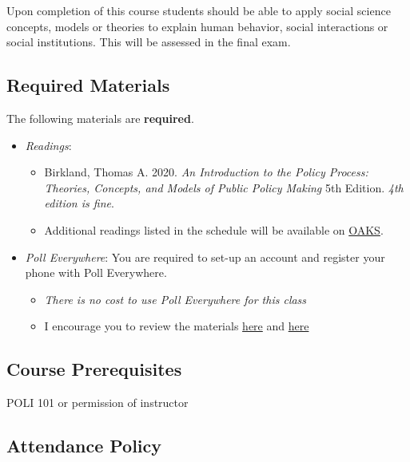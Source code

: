 Upon completion of this course students should be able to apply social
science concepts, models or theories to explain human behavior, social
interactions or social institutions. This will be assessed in the final
exam.

\hypertarget{required-materials}{%
\subsection{Required Materials}\label{required-materials}}

The following materials are \textbf{required}.

\begin{itemize}

\item
  \emph{Readings}:

  \begin{itemize}
  
  \item
    Birkland, Thomas A. 2020. \emph{An Introduction to the Policy
    Process: Theories, Concepts, and Models of Public Policy Making} 5th
    Edition. \emph{4th edition is fine}.
  \item
    Additional readings listed in the schedule will be available on
    \href{https://lms.cofc.edu/d2l/login}{OAKS}.
  \end{itemize}
\item
  \emph{Poll Everywhere}: You are required to set-up an account and
  register your phone with Poll Everywhere.

  \begin{itemize}
  
  \item
    \emph{There is no cost to use Poll Everywhere for this class}
  \item
    I encourage you to review the materials
    \href{https://www.polleverywhere.com/guides/student}{here} and
    \href{https://blog.polleverywhere.com/students-poll-everywhere-101/}{here}
  \end{itemize}
\end{itemize}

\hypertarget{course-prerequisites}{%
\subsection{Course Prerequisites}\label{course-prerequisites}}

POLI 101 or permission of instructor

\hypertarget{attendance-policy}{%
\subsection{Attendance Policy}\label{attendance-policy}}

